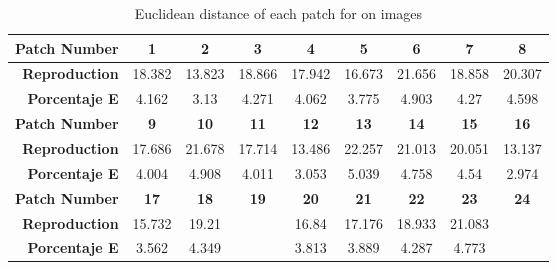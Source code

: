 \begin{table}[H]
  \caption{Euclidean distance of each patch for on images }
  \begin{center}
    \begin{tabularx}{\textwidth}{r c c c c c c c c}
    \toprule
        \textbf{Patch Number} & \textbf{1} & \textbf{2} & \textbf{3} & \textbf{4} & \textbf{5} & \textbf{6} & \textbf{7} & \textbf{8}\\ \midrule 
        \textbf{Reproduction} &18.382 &13.823 &18.866 &17.942 &16.673 &21.656 &18.858 &20.307\\ 
        \textbf{Porcentaje E} &4.162 &3.13 &4.271 &4.062 &3.775 &4.903 &4.27 &4.598\\ \midrule 
        \textbf{Patch Number} & \textbf{9} & \textbf{10} & \textbf{11} & \textbf{12} & \textbf{13} & \textbf{14} & \textbf{15} & \textbf{16}\\ \midrule 
        \textbf{Reproduction} &17.686 &21.678 &17.714 &13.486 &22.257 &21.013 &20.051 &13.137\\ 
        \textbf{Porcentaje E} &4.004 &4.908 &4.011 &3.053 &5.039 &4.758 &4.54 &2.974\\ \midrule 
        \textbf{Patch Number} & \textbf{17} & \textbf{18} & \textbf{19} & \textbf{20} & \textbf{21} & \textbf{22} & \textbf{23} & \textbf{24}\\ \midrule 
        \textbf{Reproduction} &15.732 &19.21 &\cellcolor{colorgreen}{8.956} &16.84 &17.176 &18.933 &21.083 &\cellcolor{colorred}{26.841}\\ 
        \textbf{Porcentaje E} &3.562 &4.349 &\cellcolor{colorgreen}{2.028} &3.813 &3.889 &4.287 &4.773 &\cellcolor{colorred}{6.077}\\ \midrule 
    \bottomrule
    \end{tabularx}
  \end{center}
\end{table}
